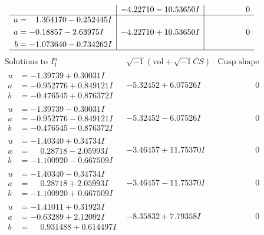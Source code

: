\documentclass[1p]{elsarticle_modified}
\theoremstyle{definition}
\newcommand{\I}{\sqrt{-1}}
\begin{document}
$$\begin{array}{c|c|c}
 & -4.22710 - 10.53650 I & \phantom{-0.000000 } 0 \\ \hline\begin{aligned}
u &= \phantom{-}1.364170 - 0.252445 I \\
a &= -0.18857 - 2.63975 I \\
b &= -1.073640 - 0.734262 I\end{aligned}
 & -4.22710 + 10.53650 I & \phantom{-0.000000 } 0\\
 \hline 
 \end{array}$$\newpage$$\begin{array}{c|c|c}  
\text{Solutions to }I^u_{1}& \I (\text{vol} + \sqrt{-1}CS) & \text{Cusp shape}\\
 \hline 
\begin{aligned}
u &= -1.39739 + 0.30031 I \\
a &= -0.952776 + 0.849121 I \\
b &= -0.476545 + 0.876372 I\end{aligned}
 & -5.32452 + 6.07526 I & \phantom{-0.000000 } 0 \\ \hline\begin{aligned}
u &= -1.39739 - 0.30031 I \\
a &= -0.952776 - 0.849121 I \\
b &= -0.476545 - 0.876372 I\end{aligned}
 & -5.32452 - 6.07526 I & \phantom{-0.000000 } 0 \\ \hline\begin{aligned}
u &= -1.40340 + 0.34734 I \\
a &= \phantom{-}0.28718 - 2.05993 I \\
b &= -1.100920 - 0.667509 I\end{aligned}
 & -3.46457 + 11.75370 I & \phantom{-0.000000 } 0 \\ \hline\begin{aligned}
u &= -1.40340 - 0.34734 I \\
a &= \phantom{-}0.28718 + 2.05993 I \\
b &= -1.100920 + 0.667509 I\end{aligned}
 & -3.46457 - 11.75370 I & \phantom{-0.000000 } 0 \\ \hline\begin{aligned}
u &= -1.41011 + 0.31923 I \\
a &= -0.63289 + 2.12092 I \\
b &= \phantom{-}0.931488 + 0.614497 I\end{aligned}
 & -8.35832 + 7.79358 I & \phantom{-0.000000 } 0 \\ \hline\begin{aligned}

\end{aligned}
\end{array}$$
\end{document}
